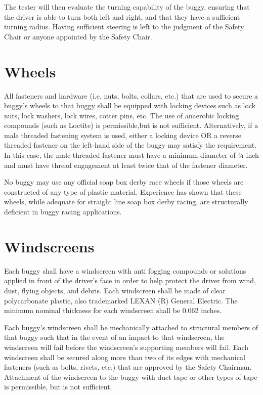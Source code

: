 The tester will then evaluate the turning capability of the buggy, ensuring that the driver is able to turn both left and right, and that they have a sufficient turning radius. Having sufficient steering is left to the judgment of the Safety Chair or anyone appointed by the Safety Chair. 


\section{Wheels}

	All fasteners and hardware (i.e. nuts, bolts, collars, etc.) that are used to secure a buggy's wheels to that buggy shall be equipped with locking devices such as lock nuts, lock washers, lock wires, cotter pins, etc. The use of anaerobic locking compounds (such as Loctite) is permissible,but is not sufficient. Alternatively, if a male threaded fastening system is used, either a locking device OR a reverse threaded fastener on the left-hand side of the buggy may satisfy the requirement. In this case, the male threaded fastener must have a minimum diameter of ¼ inch and must have thread engagement at least twice that of the fastener diameter. 


	No buggy may use any official soap box derby race wheels if those wheels are constructed of any type of plastic material. Experience has shown that these wheels, while adequate for straight line soap box derby racing, are structurally deficient in buggy racing applications.

\section{Windscreens}

	Each buggy shall have a windscreen with anti fogging compounds or solutions applied in front of the driver's face in order to help protect the driver from wind, dust, flying objects, and debris. Each windscreen shall be made of clear polycarbonate plastic, also trademarked LEXAN (R) General Electric. The minimum nominal thickness for each windscreen shall be 0.062 inches.
	
	Each buggy's windscreen shall be mechanically attached to structural members of that buggy such that in the event of an impact to that windscreen, the windscreen will fail before the windscreen's supporting members will fail. Each windscreen shall be secured along more than two of its edges with mechanical fasteners (such as bolts, rivets, etc.) that are approved by the Safety Chairman. Attachment of the windscreen to the buggy with duct tape or other types of tape is permissible, but is not sufficient.
	
